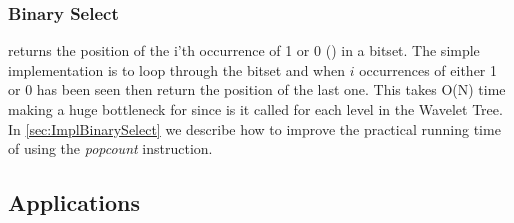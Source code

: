 \subsubsection{Binary Select}
 returns the position of the i'th occurrence of 1 or 0 () in a bitset. 
The simple implementation is to loop through the bitset and when $i$ occurrences of either 1 or 0 has been seen then return the position of the last one. 
This takes O(N) time making  a huge bottleneck for  since is it called for each level in the Wavelet Tree. 
In \ref{sec:ImplBinarySelect} we describe how to improve the practical running time of  using the \textit{popcount} instruction.

\subsection{Applications}





